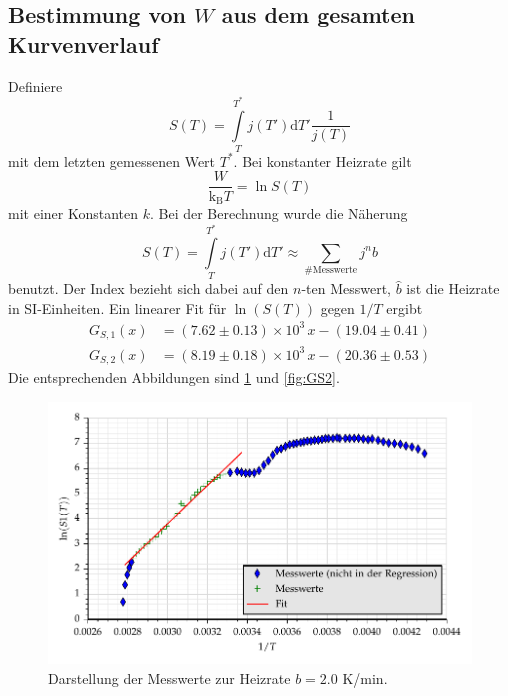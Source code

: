 \subsection{Bestimmung von $W$ aus dem gesamten Kurvenverlauf}
Definiere 
\begin{equation}
S(T)=\int\limits_T^{T^*} j(T') \text{d}T' \frac{1}{j(T)}
\end{equation}
mit dem letzten gemessenen Wert $T^*$.
Bei konstanter Heizrate gilt
\begin{equation}
\frac{W}{\text{k}_\text{B} T}=\ln S(T)
\end{equation}
mit einer Konstanten $k$. Bei der Berechnung wurde die Näherung 
\begin{equation}
S(T)=\int\limits_T^{T^*} j(T') \text{d}T' \approx \sum\limits_{\#\text{Messwerte}} j^n  \hat{b}
\end{equation}
benutzt. Der Index bezieht sich dabei auf den $n$-ten Messwert, $\hat{b}$ ist die 
Heizrate in SI-Einheiten. Ein linearer Fit für $\ln(S(T))$ gegen $1/T$ ergibt 
%
%
\begin{align}
G_{S,1}(x)&= (7.62 \pm 0.13 )\times 10^{3} \,x - (19.04 \pm 0.41)  \\
G_{S,2}(x)&= (8.19 \pm 0.18 )\times 10^{3} \,x - (20.36 \pm 0.53)
\end{align}
Die entsprechenden Abbildungen sind \ref{fig:GS1} und \ref{fig:GS2}.
\begin{figure}[h]
\centering
\includegraphics[scale=0.8]{../skript/S1.pdf}
\caption{Darstellung der Messwerte zur Heizrate $b=2.0$ K/min.}
\label{fig:GS1}
\end{figure}
